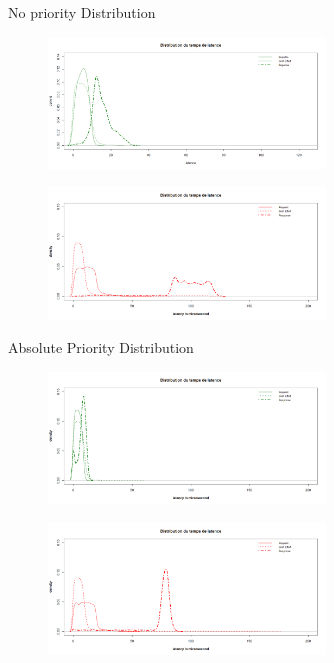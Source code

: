\documentclass[10 pt]{beamer}
\begin{document}
\begin{frame}{No priority Distribution }
\begin{figure}[h!]

\includegraphics[height=3.5cm]{sanspriofa.png}
\label{fig:1}

\end{figure}

\begin{figure}[h!]

\includegraphics[height=3.5cm]{sanspriofo.png}
\label{fig:1}

\end{figure}
\end{frame}

\begin{frame}{ Absolute Priority Distribution}
\begin{figure}[h!]

\includegraphics[height=3.5cm]{prioabsfa.png}
\label{fig:1}

\end{figure}

\begin{figure}[h!]

\includegraphics[height=3.5cm]{prioabsfo.png}
\label{fig:1}

\end{figure}
\end{frame}
\end{document}
